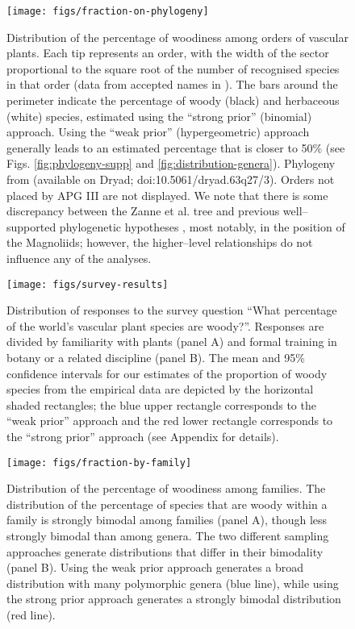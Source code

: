 \documentclass[a4paper,12pt]{article}
\begin{document}
\begin{figure}[p]
  \centering
  \texttt{[image: figs/fraction-on-phylogeny]}
  \caption{Distribution of the percentage of woodiness among orders of
    vascular plants.  Each tip represents an order, with the width of
    the sector proportional to the square root of the number of
    recognised species in that order (data from accepted names in
    \citet{ThePlantList}).  The bars around the perimeter indicate the
    percentage of woody (black) and herbaceous (white) species,
    estimated using the ``strong prior'' (binomial) approach.  Using
    the ``weak prior'' (hypergeometric) approach generally leads to an
    estimated percentage that is closer to 50\% (see Figs.
    \ref{fig:phylogeny-supp} and \ref{fig:distribution-genera}).
    Phylogeny from \citet{Zanne} (available on Dryad; 
    doi:10.5061/dryad.63q27/3). Orders not placed by APG III
    \citep{APG3} are not displayed. We note that there is some discrepancy between
    the Zanne et al. tree and previous well--supported
    phylogenetic hypotheses \citep[e.g.,][]{Soltis2011}, most notably, in the
    position of the Magnoliids; however, the higher--level relationships 
    do not influence any of the analyses.}
\label{fig:phylogeny}
\end{figure}


\begin{figure}[p]
  \centering
  \texttt{[image: figs/survey-results]}
  \caption{Distribution of responses to the survey question ``What
    percentage of the world's vascular plant species are
    woody?''. Responses are divided by familiarity with plants
    (panel A) and formal training in botany or a related discipline
    (panel B). The mean and 95\% confidence intervals for our
    estimates of the proportion of woody species from the empirical
    data are depicted by the horizontal shaded rectangles; the blue
    upper rectangle corresponds to the ``weak prior'' approach and the
    red lower rectangle corresponds to the ``strong prior'' approach
    (see Appendix for details).}
  \label{fig:survey}
\end{figure}

\clearpage
\renewcommand\thefigure{S.\arabic{figure}}
\renewcommand\thetable{S.\arabic{table}}
\setcounter{figure}{0}    
\setcounter{table}{0}

\begin{figure}[p]
  \centering
  \texttt{[image: figs/fraction-by-family]}
  \caption{Distribution of the percentage of woodiness among families.
    The distribution of the percentage of species that are woody within
    a family is strongly bimodal among families (panel A), though less
    strongly bimodal than among genera.
    The two different sampling approaches generate distributions that
    differ in their bimodality (panel B).  Using the weak prior
    approach generates a broad distribution with many polymorphic
    genera (blue line), while using the strong prior approach
    generates a strongly bimodal distribution (red line).}
  \label{fig:distribution-family}
\end{figure}
\end{document}
